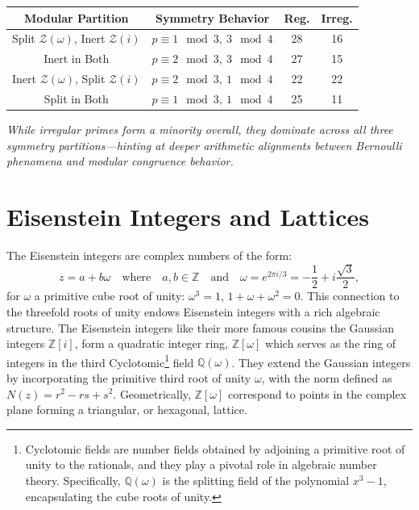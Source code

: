 \begin{center}
\begin{tabular}{|c|c|c|c|}
\hline
\textbf{Modular Partition} & \textbf{Symmetry Behavior} & \textbf{Reg.} & \textbf{Irreg.} \\
\hline
Split \(\mathcal{Z}(\omega)\), Inert \(\mathcal{Z}(i)\) & \( p \equiv 1\mod 3,\ 3\mod 4 \) & 28 & 16 \\
\hline
Inert in Both & \( p \equiv 2\mod 3,\ 3\mod 4 \) & 27 & 15 \\
\hline
Inert \(\mathcal{Z}(\omega)\), Split \(\mathcal{Z}(i)\) & \( p \equiv 2\mod 3,\ 1\mod 4 \) & 22 & 22 \\
\hline
Split in Both & \( p \equiv 1\mod 3,\ 1\mod 4 \) & 25 & 11 \\
\hline
\end{tabular}
\end{center}

\noindent
\textit{While irregular primes form a minority overall, they dominate across all three symmetry partitions—hinting at deeper arithmetic alignments between Bernoulli phenomena and modular congruence behavior.}



\section*{Eisenstein Integers and Lattices}

The Eisenstein integers are complex numbers of the form:
\[
z = a + b\omega \quad \text{where} \quad a, b \in \mathbb{Z} \quad \text{and} \quad \omega = e^{2\pi i / 3} = -\frac{1}{2} + i\frac{\sqrt{3}}{2},
\]
for \( \omega \) a primitive cube root of unity:
\( \omega^3 = 1 \), \( 1 + \omega + \omega^2 = 0 \). This connection to the threefold roots of unity endows Eisenstein integers with a rich algebraic structure. The Eisenstein integers like their more famous cousins the Gaussian integers \( \mathbb{Z}[i] \), form a quadratic integer ring, \( \mathbb{Z}[\omega] \) which serves as the ring of integers in the third Cyclotomic\footnote{Cyclotomic fields are number fields obtained by adjoining a primitive root of unity to the rationals, and they play a pivotal role in algebraic number theory. Specifically, \( \mathbb{Q}(\omega) \) is the splitting field of the polynomial \( x^3 - 1 \), encapsulating the cube roots of unity.}  field \( \mathbb{Q}(\omega) \). They extend the Gaussian integers by incorporating the primitive third root of unity \( \omega \), with the norm defined as \( N(z) = r^2 - rs + s^2 \). Geometrically, \( \mathbb{Z}[\omega] \)  correspond to points in the complex plane forming a triangular, or hexagonal, lattice. 

